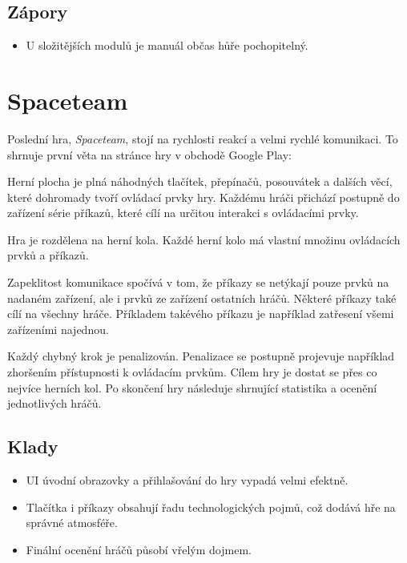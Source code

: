 \subsection*{Zápory}

\begin{itemize}
    \item U složitějších modulů je manuál občas hůře pochopitelný.
\end{itemize}

\section{Spaceteam}

Poslední hra, \emph{Spaceteam}, stojí na rychlosti reakcí a velmi rychlé
komunikaci.
To shrnuje první věta na stránce hry \cite{henrysmithinc_spaceteam}
v obchodě Google Play: 

Herní plocha je plná náhodných tlačítek, přepínačů, posouvátek a dalších věcí,
které dohromady tvoří ovládací prvky hry.
Každému hráči přichází postupně do zařízení série příkazů,
které cílí na určitou interakci s ovládacími prvky.

Hra je rozdělena na herní kola.
Každé herní kolo má vlastní množinu ovládacích prvků a příkazů.

Zapeklitost komunikace spočívá v tom,
že příkazy se netýkají pouze prvků na nadaném zařízení,
ale i prvků ze zařízení ostatních hráčů.
Některé příkazy také cílí na všechny hráče.
Příkladem takévého příkazu je například zatřesení všemi zařízeními najednou.

Každý chybný krok je penalizován.
Penalizace se postupně projevuje například zhoršením přístupnosti k ovládacím
prvkům.
Cílem hry je dostat se přes co nejvíce herních kol.
Po skončení hry následuje shrnující statistika a ocenění jednotlivých hráčů.

\FloatBarrier

\subsection*{Klady}

\begin{itemize}
    \item UI úvodní obrazovky a přihlašování do hry vypadá velmi efektně.
    \item Tlačítka i příkazy obsahují řadu technologických pojmů,
což dodává hře na správné atmosféře.
    \item Finální ocenění hráčů působí vřelým dojmem.
\end{itemize}

